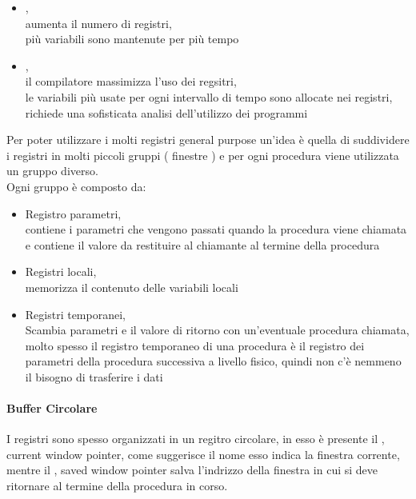 \documentclass[arch.tex]{subfiles}
\begin{document}
\begin{itemize}
	\item {},\\
		aumenta il numero di registri,\\
		più variabili sono mantenute per più tempo
	\item {},\\
		il compilatore massimizza l'uso dei regsitri,\\
		le variabili più usate per ogni intervallo di tempo sono allocate nei registri,\\
		richiede una sofisticata analisi dell'utilizzo dei programmi
\end{itemize}
Per poter utilizzare i molti registri general purpose un'idea è quella di suddividere i registri
in molti piccoli gruppi ( finestre ) e per ogni procedura viene utilizzata un gruppo diverso.\\
Ogni gruppo è composto da:
\begin{itemize}
	\item Registro parametri,\\
		contiene i parametri che vengono passati quando la procedura viene chiamata
		e contiene il valore da restituire al chiamante al termine della procedura
	\item Registri locali,\\
		memorizza il contenuto delle variabili locali
	\item Registri temporanei,\\
		Scambia parametri e il valore di ritorno con un'eventuale procedura chiamata,\\
		molto spesso il registro temporaneo di una procedura  è il registro
		dei parametri della procedura successiva  a livello fisico, quindi
		non c'è nemmeno il bisogno di trasferire i dati
\end{itemize}

\paragraph{Buffer Circolare}%
\label{par:buffer_circolare}

I registri sono spesso organizzati in un regitro circolare, in esso è presente il , 
current window pointer, come suggerisce il nome esso indica la finestra corrente,\\
mentre il , saved window pointer salva l'indrizzo della finestra in cui si deve 
ritornare al termine della procedura in corso.
\end{document}
